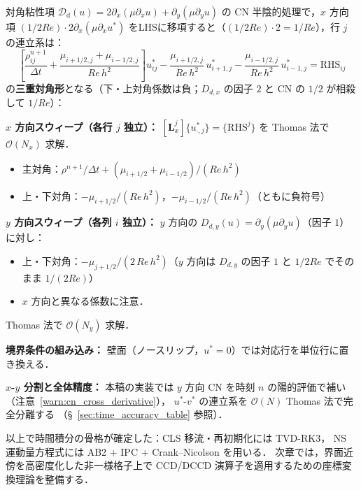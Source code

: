 \begin{tcolorbox}[resultbox, title={CN 対角粘性系の行列構造}]
\label{box:cn_tridiagonal}
対角粘性項 $\mathcal{D}_{\mathrm{d}}(u) = 2\partial_x(\mu\partial_x u) + \partial_y(\mu\partial_y u)$
の CN 半陰的処理で，$x$ 方向項 $(1/2Re)\cdot 2\partial_x(\mu\partial_x u^*)$
をLHSに移項すると（$(1/2Re)\cdot 2 = 1/Re$），行 $j$ の連立系は：
\[
  \left[\frac{\rho^{n+1}_{ij}}{\Delta t}
    + \frac{\mu_{i+1/2,j}+\mu_{i-1/2,j}}{Re\,h^2}\right]u^*_{ij}
  - \frac{\mu_{i+1/2,j}}{Re\,h^2}\,u^*_{i+1,j}
  - \frac{\mu_{i-1/2,j}}{Re\,h^2}\,u^*_{i-1,j}
  = \mathrm{RHS}_{ij}
\]
の\textbf{三重対角形}となる（下・上対角係数は負；$D_{d,x}$ の因子 $2$ と CN の $1/2$ が相殺して $1/Re$）：

\medskip
\textbf{$x$ 方向スウィープ（各行 $j$ 独立）：}
$[\mathbf{L}_x^j]\{u^*_{\cdot,j}\} = \{\mathrm{RHS}^j\}$ を Thomas 法で $\mathcal{O}(N_x)$ 求解．
\begin{itemize}
  \item 主対角：$\rho^{n+1}/\Delta t + (\mu_{i+1/2}+\mu_{i-1/2})/(Re\,h^2)$
  \item 上・下対角：$-\mu_{i+1/2}/(Re\,h^2)$，$-\mu_{i-1/2}/(Re\,h^2)$（ともに負符号）
\end{itemize}

\textbf{$y$ 方向スウィープ（各列 $i$ 独立）：}
$y$ 方向の $D_{d,y}(u) = \partial_y(\mu\partial_y u)$（因子 $1$）に対し：
\begin{itemize}
  \item 上・下対角：$-\mu_{j+1/2}/(2\,Re\,h^2)$（$y$ 方向は $D_{d,y}$ の因子 $1$ と $1/2Re$ でそのまま $1/(2Re)$）
  \item $x$ 方向と異なる係数に注意．
\end{itemize}
Thomas 法で $\mathcal{O}(N_y)$ 求解．

\textbf{境界条件の組み込み：}
壁面（ノースリップ，$u^*=0$）では対応行を単位行に置き換える．

\textbf{$x$-$y$ 分割と全体精度：}
本稿の実装では $y$ 方向 CN を時刻 $n$ の陽的評価で補い（注意~\ref{warn:cn_cross_derivative}），
$u^*$-$v^*$ の連立系を $\mathcal{O}(N)$ Thomas 法で完全分離する
（§~\ref{sec:time_accuracy_table} 参照）．
\end{tcolorbox}

以上で時間積分の骨格が確定した：CLS 移流・再初期化には TVD-RK3，
NS 運動量方程式には AB2 + IPC + Crank--Nicolson を用いる．
次章では，界面近傍を高密度化した非一様格子上で CCD/DCCD 演算子を適用するための座標変換理論を整備する．
